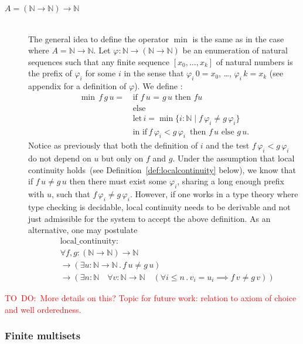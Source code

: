 \documentclass[envcountsame]{llncs}
\newcommand{\todo}[1]{\textcolor{red}{TO~DO:~#1}}
\newcommand{\N}{\mathbb{N}}
\begin{document}
\begin{description}
\bigskip
\item[$A=(\N\to\N)\to\N$] \hfill\\
The general idea to define the operator $\min$ is the same as in the case where $A=\N\to\N$. Let $\varphi : \N \to (\N\to\N)$ be an enumeration of natural sequences such that any finite sequence $[x_0,\dots,x_k]$ of
natural numbers is the prefix of $\varphi_i$ for some $i$  in the sense that $\varphi_i \,0 = x_0$, \dots, $\varphi_i\,k = x_k$ (see appendix for a definition of $\varphi$).
We define :
\begin{align*}
 \min\,f\,g\,u =\,&\text{if $f \,u$ = $g\,u$ then $f u$}\\
                 &\text{else }\\
                 &\text{let}\,i = \min \{ i : \N\mid f\,\varphi_ i \not= g\,\varphi_ i \}\\
                 &\text{in }\text{if}\, f\,\varphi_ i< g\,\varphi_ i\,\text{ then } f\,u \text{ else } g\,u.
\end{align*}
Notice as previously that both the definition of $i$ and the test $f\,\varphi_i < g\,\varphi_ i$ do not depend on $u$ but only on $f$ and $g$. Under the assumption that local continuity holds~(see Definition~\ref{def:localcontinuity} below), we know that if $f\,u\not=g\,u$ then there must exist some $\varphi_i$, sharing a long enough prefix with $u$, such that $f\,\varphi_ i \not= g\,\varphi_ i$. However, if one works in a type theory where type checking is decidable, local continuity needs to be derivable and not just admissible for the system to accept the above definition. As an alternative, one may  postulate
\begin{align*}
&\text{local\_continuity}:\\
&\forall f,g: (\N\to\N)\to\N\\
&\to(\exists u:\N\to\N\,.\,f\,u\neq g\,u)\\
&\to (\exists n:\N \quad \forall v:\N\to\N\quad(\forall i\leq n\,.\,v_i= u_i\implies f\,v\neq g\,v))
\end{align*}

\end{description}
\todo{More details on this? Topic for future work: relation to axiom of choice and well orderedness.}

\subsubsection*{Finite multisets}
\end{document}
